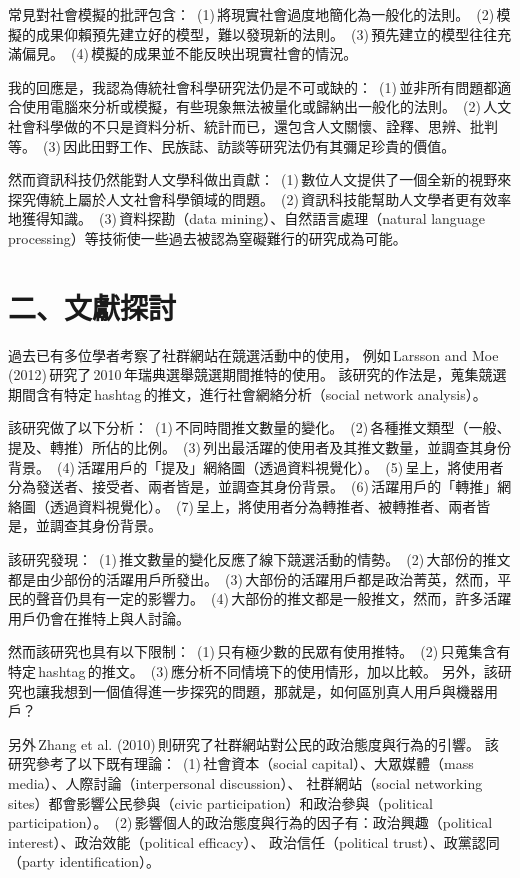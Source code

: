 \documentclass[letterpaper, 10pt, conference]{ieeeconf}   %
\begin{document}
\begin{CJK*}{UTF8}{bsmi}
常見對社會模擬的批評包含：
\,(1)\,將現實社會過度地簡化為一般化的法則。
\,(2)\,模擬的成果仰賴預先建立好的模型，難以發現新的法則。
\,(3)\,預先建立的模型往往充滿偏見。
\,(4)\,模擬的成果並不能反映出現實社會的情況。

我的回應是，我認為傳統社會科學研究法仍是不可或缺的：
\,(1)\,並非所有問題都適合使用電腦來分析或模擬，有些現象無法被量化或歸納出一般化的法則。
\,(2)\,人文社會科學做的不只是資料分析、統計而已，還包含人文關懷、詮釋、思辨、批判等。
\,(3)\,因此田野工作、民族誌、訪談等研究法仍有其彌足珍貴的價值。

然而資訊科技仍然能對人文學科做出貢獻：
\,(1)\,數位人文提供了一個全新的視野來探究傳統上屬於人文社會科學領域的問題。
\,(2)\,資訊科技能幫助人文學者更有效率地獲得知識。
\,(3)\,資料探勘（data mining）、自然語言處理（natural language processing）等技術使一些過去被認為窒礙難行的研究成為可能。

\section*{二、文獻探討}

過去已有多位學者考察了社群網站在競選活動中的使用，
例如\,Larsson and Moe (2012)\,研究了\,2010\,年瑞典選舉競選期間推特的使用。\cite{c1}
該研究的作法是，蒐集競選期間含有特定\,hashtag\,的推文，進行社會網絡分析（social network analysis）。

該研究做了以下分析：
\,(1)\,不同時間推文數量的變化。
\,(2)\,各種推文類型（一般、提及、轉推）所佔的比例。
\,(3)\,列出最活躍的使用者及其推文數量，並調查其身份背景。
\,(4)\,活躍用戶的「提及」網絡圖（透過資料視覺化）。
\,(5)\,呈上，將使用者分為發送者、接受者、兩者皆是，並調查其身份背景。
\,(6)\,活躍用戶的「轉推」網絡圖（透過資料視覺化）。
\,(7)\,呈上，將使用者分為轉推者、被轉推者、兩者皆是，並調查其身份背景。

該研究發現：
\,(1)\,推文數量的變化反應了線下競選活動的情勢。
\,(2)\,大部份的推文都是由少部份的活躍用戶所發出。
\,(3)\,大部份的活躍用戶都是政治菁英，然而，平民的聲音仍具有一定的影響力。
\,(4)\,大部份的推文都是一般推文，然而，許多活躍用戶仍會在推特上與人討論。

然而該研究也具有以下限制：
\,(1)\,只有極少數的民眾有使用推特。
\,(2)\,只蒐集含有特定\,hashtag\,的推文。
\,(3)\,應分析不同情境下的使用情形，加以比較。
另外，該研究也讓我想到一個值得進一步探究的問題，那就是，如何區別真人用戶與機器用戶？

另外\,Zhang et al. (2010)\,則研究了社群網站對公民的政治態度與行為的引響。\cite{c2}
該研究參考了以下既有理論：
\,(1)\,社會資本（social capital）、大眾媒體（mass media）、人際討論（interpersonal discussion）、
社群網站（social networking sites）都會影響公民參與（civic participation）和政治參與（political participation）。
\,(2)\,影響個人的政治態度與行為的因子有：政治興趣（political interest）、政治效能（political efficacy）、
政治信任（political trust）、政黨認同（party identification）。


\end{CJK*}
\end{document}
